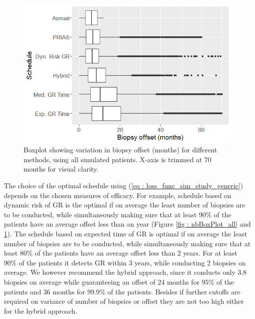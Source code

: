 \begin{figure}[!htb]
\centerline{\includegraphics[width=\columnwidth]{images/sim_study/offsetBoxPlot_all.png}}
\caption{Boxplot showing variation in biopsy offset (months) for different methods, using all simulated patients. X-axis is trimmed at 70 months for visual clarity.}
\label{fig : offsetBoxPlot_all}
\end{figure}

The choice of the optimal schedule using (\ref{eq : loss_func_sim_study_generic}) depends on the chosen measures of efficacy. For example, schedule based on dynamic risk of GR is the optimal if on average the least number of biopsies are to be conducted, while simultaneously making sure that at least 90\% of the patients have an average offset less than an year (Figure \ref{fig : nbBoxPlot_all} and \ref{fig : offsetBoxPlot_all}). The schedule based on expected time of GR is optimal if on average the least number of biopsies are to be conducted, while simultaneously making sure that at least 80\% of the patients have an average offset less than 2 years. For at least 90\% of the patients it detects GR within 3 years, while conducting 2 biopsies on average. We however recommend the hybrid approach, since it conducts only 3.8 biopsies on average while guaranteeing an offset of 24 months for 95\% of the patients and 36 months for 99.9\% of the patients. Besides if further cutoffs are required on variance of number of biopsies or offset they are not too high either for the hybrid approach.